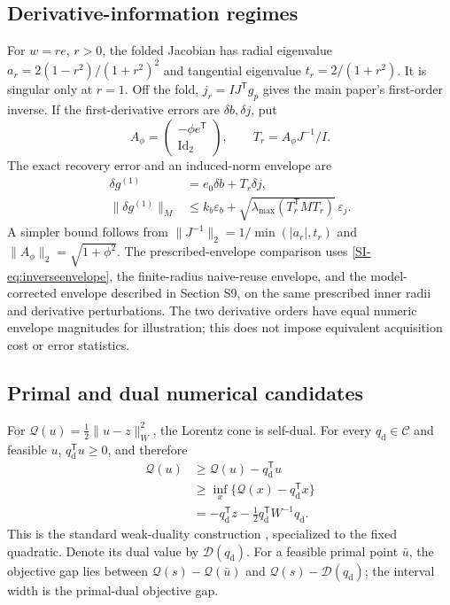\subsection{Derivative-information regimes}
For $w=re$, $r>0$, the folded Jacobian has radial eigenvalue $a_r=2(1-r^2)/(1+r^2)^2$ and tangential eigenvalue $t_r=2/(1+r^2)$. It is singular only at $r=1$. Off the fold, $j_r=IJ^{\mathsf T}g_p$ gives the main paper's first-order inverse. If the first-derivative errors are $\delta b,\delta j$, put
\begin{equation}
 A_\phi=\begin{pmatrix}-\phi e^{\mathsf T}\\\operatorname{Id}_2\end{pmatrix},\qquad
 T_r=A_\phi J^{-1}/I.
 \label{SI-eq:inverseerroroperator}
\end{equation}
The exact recovery error and an induced-norm envelope are
\begin{equation}
 \begin{aligned}
 \delta g^{(1)}&=e_0\delta b+T_r\delta j,\\
 \|\delta g^{(1)}\|_M&\leq k_b\varepsilon_b+
 \sqrt{\lambda_{\max}(T_r^{\mathsf T}MT_r)}\,\varepsilon_j.
 \end{aligned}
 \label{SI-eq:inverseenvelope}
\end{equation}
A simpler bound follows from $\|J^{-1}\|_2=1/\min(|a_r|,t_r)$ and $\|A_\phi\|_2=\sqrt{1+\phi^2}$. The prescribed-envelope comparison uses \eqref{SI-eq:inverseenvelope}, the finite-radius naive-reuse envelope, and the model-corrected envelope described in Section S9, on the same prescribed inner radii and derivative perturbations. The two derivative orders have equal numeric envelope magnitudes for illustration; this does not impose equivalent acquisition cost or error statistics.

\subsection{Primal and dual numerical candidates}
For $\mathcal Q(u)=\tfrac12\|u-z\|_W^2$, the Lorentz cone is self-dual. For every $q_{\mathrm d}\in\mathcal C$ and feasible $u$, $q_{\mathrm d}^{\mathsf T}u\geq0$, and therefore
\begin{equation}
 \begin{aligned}
 \mathcal Q(u)&\geq \mathcal Q(u)-q_{\mathrm d}^{\mathsf T}u\\
 &\geq\inf_x\{\mathcal Q(x)-q_{\mathrm d}^{\mathsf T}x\}\\
 &=-q_{\mathrm d}^{\mathsf T}z-\tfrac12q_{\mathrm d}^{\mathsf T}W^{-1}q_{\mathrm d}.
 \end{aligned}
 \label{SI-eq:dualgapderivation}
\end{equation}
This is the standard weak-duality construction \cite{supp-cvxbook}, specialized to the fixed quadratic. Denote its dual value by $\mathcal D(q_{\mathrm d})$. For a feasible primal point $\bar u$, the objective gap lies between $\mathcal Q(s)-\mathcal Q(\bar u)$ and $\mathcal Q(s)-\mathcal D(q_{\mathrm d})$; the interval width is the primal-dual objective gap.

